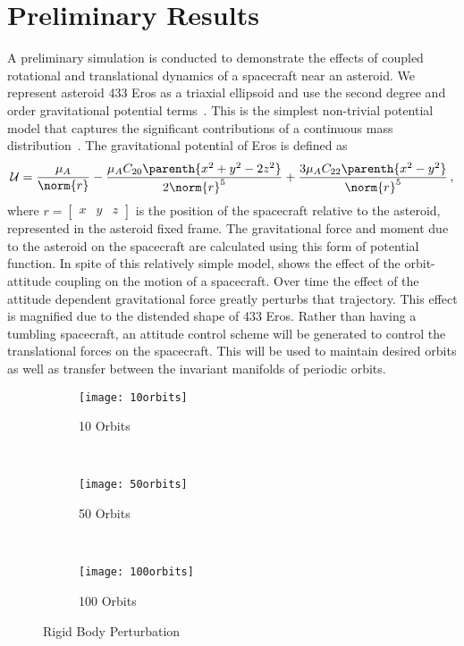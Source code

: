 \documentclass[11pt]{article} %
\begin{document}
\section{Preliminary Results}
A preliminary simulation is conducted to demonstrate the effects of coupled rotational and translational dynamics of a spacecraft near an asteroid.
We represent asteroid 433 Eros as a triaxial ellipsoid and use the second degree and order gravitational potential terms~\cite{misra2015}.
This is the simplest non-trivial potential model that captures the significant contributions of a continuous mass distribution~\cite{scheeres2012a}.
The gravitational potential of Eros is defined as
\begin{align*}
	\mathcal{U} = \frac{\mu_A}{\norm{r}}-\frac{\mu_A C_{20} \parenth{x^2 + y^2 - 2 z^2}}{2 \norm{r}^5} + \frac{3 \mu_A C_{22} \parenth{x^2 - y^2}}{\norm{r}^5}\, ,
\end{align*}
where \( r = \begin{bmatrix} x & y & z \end{bmatrix} \) is the position of the spacecraft relative to the asteroid, represented in the asteroid fixed frame.
The gravitational force and moment due to the asteroid on the spacecraft are calculated using this form of potential function.
In spite of this relatively simple model,  shows the effect of the orbit-attitude coupling on the motion of a spacecraft.
Over time the effect of the attitude dependent gravitational force greatly perturbs that trajectory.
This effect is magnified due to the distended shape of 433 Eros.
Rather than having a tumbling spacecraft, an attitude control scheme will be generated to control the translational forces on the spacecraft. 
This will be used to maintain desired orbits as well as transfer between the invariant manifolds of periodic orbits.
\begin{figure} 
	\centering 
	\begin{subfigure}[htbp]{0.3\textwidth} 
		\texttt{[image: 10orbits]} 
		\caption{\num{10} Orbits} \label{fig:10orbits} 
	\end{subfigure}~ %
	\begin{subfigure}[htbp]{0.3\textwidth} 
		\texttt{[image: 50orbits]} 
		\caption{\num{50} Orbits} \label{fig:50orbits} 
	\end{subfigure} ~ %
	\begin{subfigure}[htbp]{0.3\textwidth} 
		\texttt{[image: 100orbits]} 
		\caption{\num{100} Orbits} \label{fig:100orbits} 
	\end{subfigure} 
	\caption{Rigid Body Perturbation}
	\label{fig:orbits} 
\end{figure}
\end{document}
